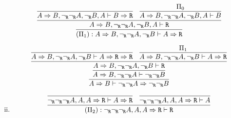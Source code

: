 \begin{enumerate}[(i)]
            \bigskip            
            
            $$
                \infer{
                                (\Pi_1) : A\Rightarrow B, \neg_\R\neg_\R A,\neg_\R B \vdash A\Rightarrow \R
                            }{
                                \infer{
                                    A\Rightarrow B, \neg_\R\neg_\R A,\neg_\R B, A\vdash \R
                                }{
                                    \infer{
                                        A\Rightarrow B, \neg_\R\neg_\R A,\neg_\R B, A\vdash B \Rightarrow \R
                                    }{
                                    }&
                                    \infer{
                                        A\Rightarrow B, \neg_\R\neg_\R A,\neg_\R B, A\vdash B
                                    }{
                                        \Pi_0
                                    }
                                }
                            }
            $$
            
            \bigskip
            
            $$
                \infer{
                    A\Rightarrow B \vdash \neg_\R\neg_\R A \Rightarrow \neg_\R \neg_\R B
                }{
                    \infer{
                        A\Rightarrow B, \neg_\R\neg_\R A \vdash \neg_\R \neg_\R B
                    }{
                        \infer{
                            A\Rightarrow B, \neg_\R\neg_\R A,\neg_\R B \vdash \R 
                        }{
                            \infer{
                                A\Rightarrow B, \neg_\R\neg_\R A,\neg_\R B \vdash A\Rightarrow \R \Rightarrow \R 
                            }{
                            }&
                            \infer{
                                A\Rightarrow B, \neg_\R\neg_\R A,\neg_\R B \vdash A\Rightarrow \R
                            }{
                                \Pi_1
                            }
                        }
                    }
                }
            $$
        \item
            $$
                            \infer{
                                (\Pi_2) : \neg_\R \neg_\R \neg_\R A, A, A\Rightarrow\R \vdash \R
                            }{
                                \infer{
                                    \neg_\R \neg_\R \neg_\R A, A, A\Rightarrow\R \vdash A\Rightarrow\R
                                }{
                                }&
                                \infer{
                                    \neg_\R \neg_\R \neg_\R A, A, A\Rightarrow\R \vdash A
                                }{
                                }
                            }
            $$        
        

\end{enumerate}
